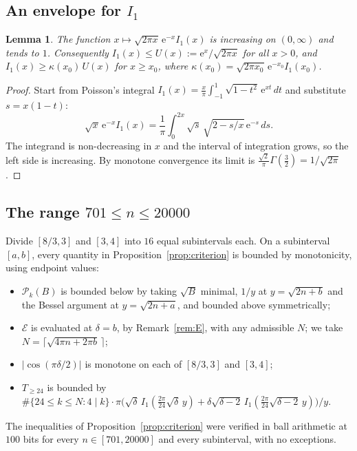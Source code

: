 \documentclass[11pt]{amsart}
\newtheorem{lemma}[theorem]{Lemma}
\theoremstyle{remark}
\theoremstyle{definition}
\newcommand{\cP}{\mathcal P}
\newcommand{\cE}{\mathcal E}
\newcommand{\e}{\mathrm e}
\begin{document}
\subsection{An envelope for \texorpdfstring{$I_1$}{I1}}

\begin{lemma}\label{lem:envelope}
The function $x\mapsto\sqrt{2\pi x}\,\e^{-x}I_1(x)$ is increasing on $(0,\infty)$ and tends to $1$. Consequently $I_1(x)\le U(x):=\e^x/\sqrt{2\pi x}$ for all $x>0$, and $I_1(x)\ge\kappa(x_0)\,U(x)$ for $x\ge x_0$, where $\kappa(x_0)=\sqrt{2\pi x_0}\,\e^{-x_0}I_1(x_0)$.
\end{lemma}

\begin{proof}
Start from Poisson's integral $I_1(x)=\frac x\pi\int_{-1}^1\sqrt{1-t^2}\,\e^{xt}\,dt$ and substitute $s=x(1-t)$:
\[
\sqrt x\,\e^{-x}I_1(x)=\frac1\pi\int_0^{2x}\sqrt s\,\sqrt{2-s/x}\,\e^{-s}\,ds .
\]
The integrand is non-decreasing in $x$ and the interval of integration grows, so the left side is increasing. By monotone convergence its limit is $\frac{\sqrt2}\pi\Gamma(\frac32)=1/\sqrt{2\pi}$.
\end{proof}

\subsection{The range \texorpdfstring{$701\le n\le20000$}{701 <= n <= 20000}}\label{sec:mid}
Divide $[8/3,3]$ and $[3,4]$ into $16$ equal subintervals each. On a subinterval $[a,b]$, every quantity in Proposition~\ref{prop:criterion} is bounded by monotonicity, using endpoint values:
\begin{itemize}[leftmargin=2em]
\item $\cP_k(B)$ is bounded below by taking $\sqrt B$ minimal, $1/y$ at $y=\sqrt{2n+b}$ and the Bessel argument at $y=\sqrt{2n+a}$, and bounded above symmetrically;
\item $\cE$ is evaluated at $\delta=b$, by Remark~\ref{rem:E}, with any admissible $N$; we take $N=\lceil\sqrt{4\pi n+2\pi b}\,\rceil$;
\item $|\cos(\pi\delta/2)|$ is monotone on each of $[8/3,3]$ and $[3,4]$;
\item $T_{\ge24}$ is bounded by $\#\{24\le k\le N:4\mid k\}\cdot\pi\big(\sqrt\delta\,I_1(\tfrac{2\pi}{24}\sqrt\delta\,y)+\delta\sqrt{\delta-2}\,I_1(\tfrac{2\pi}{24}\sqrt{\delta-2}\,y)\big)/y$.
\end{itemize}
The inequalities of Proposition~\ref{prop:criterion} were verified in ball arithmetic at $100$ bits for every $n\in[701,20000]$ and every subinterval, with no exceptions.
\end{document}
